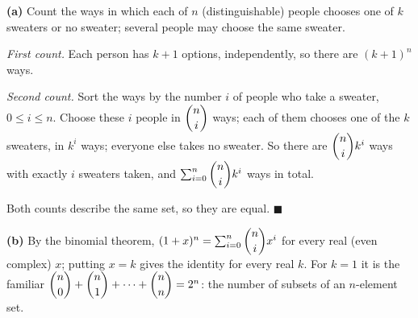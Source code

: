 \textbf{(a)} Count the ways in which each of $n$ (distinguishable) people chooses one of $k$ sweaters or no sweater; several people may choose the same sweater.

\emph{First count.} Each person has $k+1$ options, independently, so there are $(k+1)^n$ ways.

\emph{Second count.} Sort the ways by the number $i$ of people who take a sweater, $0\le i\le n$. Choose these $i$ people in $\dbinom ni$ ways; each of them chooses one of the $k$ sweaters, in $k^i$ ways; everyone else takes no sweater. So there are $\dbinom nik^i$ ways with exactly $i$ sweaters taken, and $\sum_{i=0}^{n}\dbinom nik^i$ ways in total.

Both counts describe the same set, so they are equal. $\blacksquare$

\textbf{(b)} By the binomial theorem, $(1+x)^n=\sum_{i=0}^{n}\dbinom nix^i$ for every real (even complex) $x$; putting $x=k$ gives the identity for every real $k$. For $k=1$ it is the familiar $\dbinom n0+\dbinom n1+\cdots+\dbinom nn=2^n$: the number of subsets of an $n$-element set.
